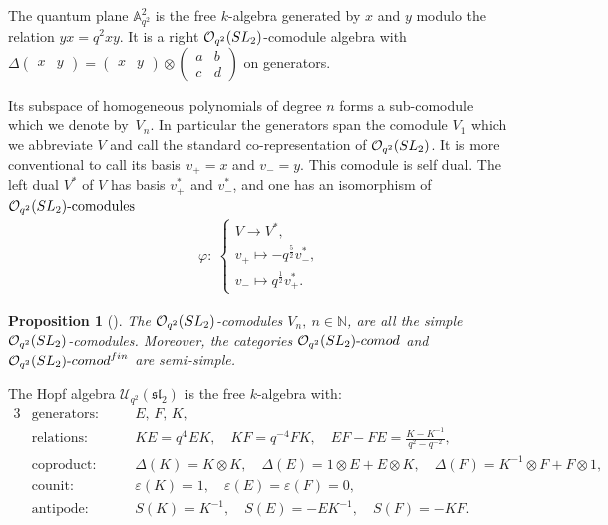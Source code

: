 \documentclass[11pt]{article}
\numberwithin{equation}{section}
\numberwithin{equation}{section}
\newtheorem{Proposition}[Theorem]{Proposition}
 { \theoremstyle{definition}
\newtheorem{Definition}[Theorem]{Definition}
\newtheorem{Note}[Theorem]{Note}
\newtheorem{Example}[Theorem]{Example}
\newtheorem{Remark}[Theorem]{Remark} }
\newcommand{\Oq}{\mathcal{O}_{q^2}({\rm SL}_2)}
\newcommand{\Uq}{\mathcal{U}_{q^2}(\mathfrak{sl}_2)}
\begin{document}
\begin{Definition}\label{defOqcomods}
The quantum plane $\mathbb{A}_{q^2}^2$ is the free $k$-algebra generated by $x$ and $y$ modulo the relation $yx = q^2xy$. It is a right $\Oq$-comodule algebra with $\Delta \left(\begin{smallmatrix} x&y \end{smallmatrix}\right) = \left(\begin{smallmatrix} x&y \end{smallmatrix}\right) \otimes \left( \begin{smallmatrix} a & b \\ c & d \end{smallmatrix}\right)$ on generators.

Its subspace of homogeneous polynomials of degree $n$ forms a sub-comodule which we denote by~$V_n$.
In particular the generators span the comodule $V_1$ which we abbreviate $V$ and call the standard co-representation of $\Oq$. It is more conventional to call its basis $v_+ = x$ and $v_- = y$. This comodule is self dual. The left dual $V^*$ of $V$ has basis $v_+^*$ and $v_-^*$, and one has an isomorphism of $\Oq\text{-comodules}$
\begin{gather*}
\varphi \colon \
\begin{cases}
V \to V^*,
\\
v_+ \mapsto -q^{\frac{5}{2}} v_-^*,
\\[.5ex]
v_- \mapsto q^{\frac{1}{2}}v_+^*.
\end{cases}
\end{gather*}
\end{Definition}

{\sloppy\begin{Proposition}[{\cite[Section~4.2.1]{Klimyk}}]\label{propOqSemiSimple}
The $\Oq$-comodules $V_n,\ n \in \mathbb{N}$, are all the simple $\Oq$-comodules. Moreover, the categories $\Oq\text{-}{\rm comod}$ and $\Oq\text{-}{\rm comod}^{\rm fin}$ are semi-simple.
\end{Proposition}}

\begin{Definition}
The Hopf algebra $\Uq$ is the free $k$-algebra with:
\begin{alignat*}{3}
& \text{generators}\colon\quad  &&E,\,F,\,K,&
\\
&\text{relations}\colon && KE=q^4EK, \quad KF=q^{-4}FK,\quad  EF-FE = \frac{K-K^{-1}}{q^2-q^{-2}},&
\\
&\text{coproduct}\colon &&\Delta (K) = K \otimes K,\quad \Delta (E) = 1\otimes E+E\otimes K,\quad \Delta (F) = K^{-1}\otimes F + F\otimes 1,&
\\
& \text{counit}\colon && \varepsilon(K)=1,\quad\varepsilon(E)=\varepsilon(F)=0,&
\\
& \text{antipode}\colon && S(K) = K^{-1},\quad S(E) = -EK^{-1},\quad S(F) =-KF.&
\end{alignat*}
\end{Definition}
\end{document}

